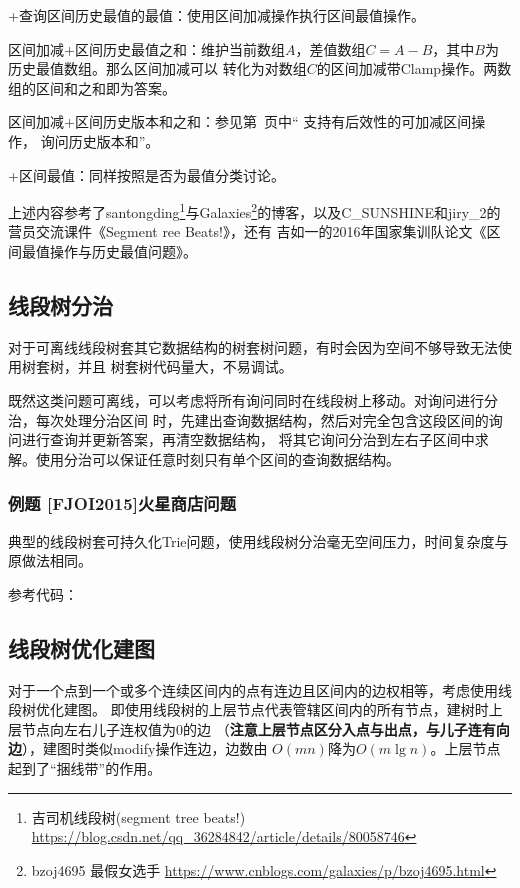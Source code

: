 +查询区间历史最值的最值：使用区间加减操作执行区间最值操作。

区间加减+区间历史最值之和：维护当前数组$A$，差值数组$C=A-B$，其中$B$为历史最值数组。那么区间加减可以
转化为对数组$C$的区间加减带Clamp操作。两数组的区间和之和即为答案。

区间加减+区间历史版本和之和：参见第~\pageref{HistorySum}页中`` 支持有后效性的可加减区间操作，
询问历史版本和''。

+区间最值：同样按照是否为最值分类讨论。

上述内容参考了santongding\footnote{
    吉司机线段树(segment tree beats!)\\
    \url{https://blog.csdn.net/qq\_36284842/article/details/80058746}
}与Galaxies\footnote{
    bzoj4695 最假女选手
    \url{https://www.cnblogs.com/galaxies/p/bzoj4695.html}
}的博客，以及C\_SUNSHINE和jiry\_2的营员交流课件《Segment ree Beats!》，还有
吉如一的2016年国家集训队论文《区间最值操作与历史最值问题》。

\subsection{线段树分治}
对于可离线线段树套其它数据结构的树套树问题，有时会因为空间不够导致无法使用树套树，并且
树套树代码量大，不易调试。

既然这类问题可离线，可以考虑将所有询问同时在线段树上移动。对询问进行分治，每次处理分治区间
时，先建出查询数据结构，然后对完全包含这段区间的询问进行查询并更新答案，再清空数据结构，
将其它询问分治到左右子区间中求解。使用分治可以保证任意时刻只有单个区间的查询数据结构。

\subsubsection{例题 [FJOI2015]火星商店问题}
典型的线段树套可持久化Trie问题，使用线段树分治毫无空间压力，时间复杂度与原做法相同。

参考代码：

\subsection{线段树优化建图}
对于一个点到一个或多个连续区间内的点有连边且区间内的边权相等，考虑使用线段树优化建图。
即使用线段树的上层节点代表管辖区间内的所有节点，建树时上层节点向左右儿子连权值为0的边
（{\bfseries 注意上层节点区分入点与出点，与儿子连有向边}），建图时类似modify操作连边，边数由
$O(mn)$降为$O(m\lg n)$。上层节点起到了``捆线带''的作用。

